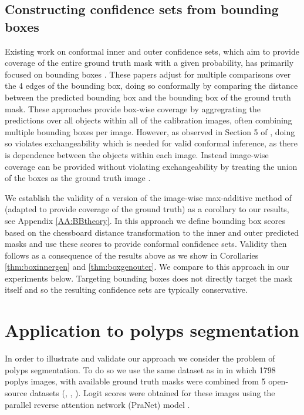 \subsection{Constructing confidence sets from bounding boxes}
Existing work on conformal inner and outer confidence sets, which aim to provide coverage of the entire ground truth mask with a given probability, has primarily focused on bounding boxes \citep{De2022, Andeol2023, Mukama2024}. These papers adjust for multiple comparisons over the 4 edges of the bounding box, doing so conformally by comparing the distance between the predicted bounding box and the bounding box of the ground truth mask. These approaches provide box-wise coverage by aggregrating the predictions over all objects within all of the calibration images, often combining multiple bounding boxes per image. However, as observed in Section 5 of \cite{De2022}, doing so violates exchangeability which is needed for valid conformal inference, as there is dependence between the objects within each image. Instead image-wise coverage can be provided without violating exchangeability by treating the union of the boxes as the ground truth image \citep{De2022, Andeol2023}.

We establish the validity of a version of the image-wise max-additive method of \cite{Andeol2023} (adapted to provide coverage of the ground truth) as a corollary to our results, see Appendix \ref{AA:BBtheory}. In this approach we define bounding box scores based on the chessboard distance transformation to the inner and outer predicted masks and use these scores to provide conformal confidence sets. Validity then follows as a consequence of the results above as we show in Corollaries \ref{thm:boxinnergen} and \ref{thm:boxgenouter}. We compare to this approach in our experiments below. Targeting bounding boxes does not directly target the mask itself and so the resulting confidence sets are typically conservative.

\section{Application to polyps segmentation}\label{SS:res}
In order to illustrate and validate our approach we consider the problem of polyps segmentation. To do so we use the same dataset as in \cite{Angelopoulos2022} in which 1798 poplys images, with available ground truth masks were combined from 5 open-source datasets (\cite{KVASIR2017}, \cite{Hyperkvasir2020} \cite{Bernal2012}, \cite{Silva2014}). Logit scores were obtained for these images using the parallel reverse attention network (PraNet) model \citep{PraNet2020}.

